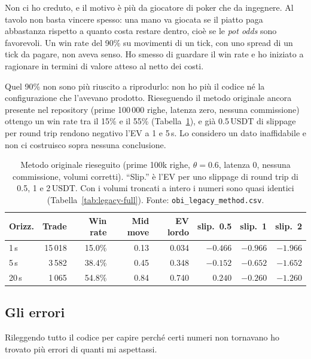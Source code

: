 \documentclass[a4paper,11pt]{article}
\newcommand{\usdt}{\ensuremath{\,\mathrm{USDT}}}
\newcommand{\code}[1]{\texttt{#1}}
\begin{document}
Non ci ho creduto, e il motivo è più da giocatore di poker che da ingegnere. Al tavolo non
basta vincere spesso: una mano va giocata se il piatto paga abbastanza rispetto a quanto costa
restare dentro, cioè se le \emph{pot odds} sono favorevoli. Un win rate del 90\% su movimenti
di un tick, con uno spread di un tick da pagare, non aveva senso. Ho smesso di guardare il win
rate e ho iniziato a ragionare in termini di valore atteso al netto dei costi.

Quel 90\% non sono più riuscito a riprodurlo: non ho più il codice né la configurazione che
l'avevano prodotto. Rieseguendo il metodo originale ancora presente nel repository (prime
100\,000 righe, latenza zero, nessuna commissione) ottengo un win rate tra il 15\% e il 55\%
(Tabella~\ref{tab:legacy}), e già 0.5\usdt{} di slippage per round trip rendono negativo l'EV a
1 e 5\,s. Lo considero un dato inaffidabile e non ci costruisco sopra nessuna conclusione.

\begin{table}[H]
\centering
\footnotesize
\caption{Metodo originale rieseguito (prime 100k righe, $\theta=0.6$, latenza 0, nessuna
commissione, volumi corretti). ``Slip.'' è l'EV per uno slippage di round trip di 0.5, 1 e
2\usdt{}. Con i volumi troncati a intero i numeri sono quasi identici
(Tabella~\ref{tab:legacy-full}). Fonte: \code{obi\_legacy\_method.csv}.}
\label{tab:legacy}
\begin{tabular}{@{}lrrrrrrr@{}}
\toprule
Orizz. & Trade & Win rate & Mid move & EV lordo & slip.\ 0.5 & slip.\ 1 & slip.\ 2 \\
\midrule
1\,s  & 15\,018 & 15.0\% & 0.13 & 0.034 & $-0.466$ & $-0.966$ & $-1.966$ \\
5\,s  & 3\,582  & 38.4\% & 0.45 & 0.348 & $-0.152$ & $-0.652$ & $-1.652$ \\
20\,s & 1\,065  & 54.8\% & 0.84 & 0.740 & $0.240$  & $-0.260$ & $-1.260$ \\
\bottomrule
\end{tabular}
\end{table}

\subsection{Gli errori}

Rileggendo tutto il codice per capire perché certi numeri non tornavano ho trovato più errori
di quanti mi aspettassi.
\end{document}
